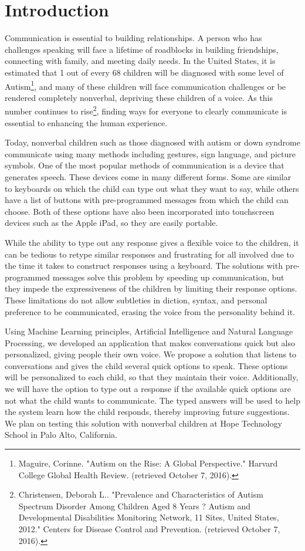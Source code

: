 \chapter{Introduction}

Communication is essential to building relationships. A person who has challenges speaking will face a lifetime of roadblocks in building friendships, connecting with family, and meeting daily needs. In the United States, it is estimated that 1 out of every 68 children will be diagnosed with some level of Autism\footnote[1]{Maguire, Corinne. "Autism on the Rise: A Global Perspective." Harvard College Global Health Review. (retrieved October 7, 2016).}, and many of these children will face communication challenges or be rendered completely nonverbal, depriving these children of a voice. As this number continues to rise\footnote[2]{Christensen, Deborah L.. "Prevalence and Characteristics of Autism Spectrum Disorder Among Children Aged 8 Years ? Autism and Developmental Disabilities Monitoring Network, 11 Sites, United States, 2012." Centers for Disease Control and Prevention. (retrieved October 7, 2016).}, finding ways for everyone to clearly communicate is essential to enhancing the human experience.

Today, nonverbal children such as those diagnosed with autism or down syndrome communicate using many methods including gestures, sign language, and picture symbols. One of the most popular methods of communication is a device that generates speech. These devices come in many different forms. Some are similar to keyboards on which the child can type out what they want to say, while others have a list of buttons with pre-programmed messages from which the child can choose. Both of these options have also been incorporated into touchscreen devices such as the Apple iPad, so they are easily portable. 

While the ability to type out any response gives a flexible voice to the children, it can be tedious to retype similar responses and frustrating for all involved due to the time it takes to construct responses using a keyboard. The solutions with pre-programmed messages solve this problem by speeding up communication, but they impede the expressiveness of the children by limiting their response options. These limitations do not allow subtleties in diction, syntax, and personal preference to be communicated, erasing the voice from the personality behind it.

Using Machine Learning principles, Artificial Intelligence and Natural Language Processing, we developed an application that makes conversations quick but also personalized, giving people their own voice. We propose a solution that listens to conversations and gives the child several quick options to speak. These options will be personalized to each child, so that they maintain their voice. Additionally, we will have the option to type out a response if the available quick options are not what the child wants to communicate. The typed answers will be used to help the system learn how the child responds, thereby improving future suggestions. We plan on testing this solution with nonverbal children at Hope Technology School in Palo Alto, California.

